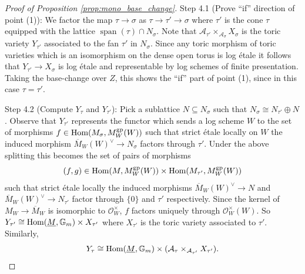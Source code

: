 \documentclass[11pt]{amsart}
\theoremstyle{definition}
\theoremstyle{remark}
\DeclareMathOperator{\Span}{span}
\def\gp{\mathrm{gp}}
\DeclareMathOperator{\Hom}{\textup{Hom}}
\begin{document}
\begin{proof}[Proof of Proposition \ref{prop:mono_base_change}]
	Step 4.1 (Prove ``if'' direction of point (1)): We factor the map $\tau\to \sigma$ as $\tau\to \tau'\to \sigma$ where $\tau'$
	is the cone $\tau$ equipped with the lattice $\Span(\tau)\cap N_{\sigma}$. Note that $\mathcal{A}_{\tau'}\times_{\mathcal{A}_{\sigma}}X_{\sigma}$
	is the toric variety $Y_{\tau'}$ associated to the fan $\tau'$ in $N_{\sigma}$. Since any toric morphism of toric varieties
	which is an isomorphism on the dense open torus is log étale it follows that $Y_{\tau'}\to X_{\sigma}$ is log étale and representable
	by log schemes of finite presentation. Taking the base-change over $Z$, this shows the ``if'' part of point (1),
	since in this case $\tau=\tau'$.

	Step 4.2 (Compute $Y_{\tau}$ and $Y_{\tau'}$): Pick a sublattice $N\subseteq N_{\sigma}$ such that $N_{\sigma}\cong N_{\tau'}\oplus N$.
	Observe that $Y_{\tau'}$ represents the functor which sends a log scheme $W$ to the set of morphisms
	$f\in \Hom(M_{\sigma},M_W^{\gp}(W))$ such that strict étale locally on $W$ the induced
	morphism $\overline{M}_W(W)^{\vee}\to N_{\sigma}$
	factors through $\tau'$. Under the above splitting this becomes the set of pairs of morphisms
	$$(f,g)\in \Hom(M,M_W^{\gp}(W))\times\Hom(M_{\tau'},M_W^{\gp}(W))$$
	such that strict étale locally the induced morphisms $\overline{M}_W(W)^{\vee}\to N$ and $\overline{M}_W(W)^{\vee}\to N_{\tau'}$
	factor through $\{0\}$ and $\tau'$ respectively. Since the kernel of $M_W\to \overline{M}_{W}$ is isomorphic to $\mathcal{O}_W^{\times}$,
	$f$ factors uniquely through $\mathcal{O}_W^{\times}(W)$. So $Y_{\tau'}\cong \Hom(\underline{M},\mathbb{G}_{m})\times X_{\tau'}$ where $X_{\tau'}$
	is the toric variety associated to $\tau'$. Similarly,
	$$Y_{\tau}\cong \Hom(\underline{M},\mathbb{G}_{m})\times (\mathcal{A}_{\tau}\times_{\mathcal{A}_{\tau'}}X_{\tau'}).$$


\end{proof}
\end{document}
